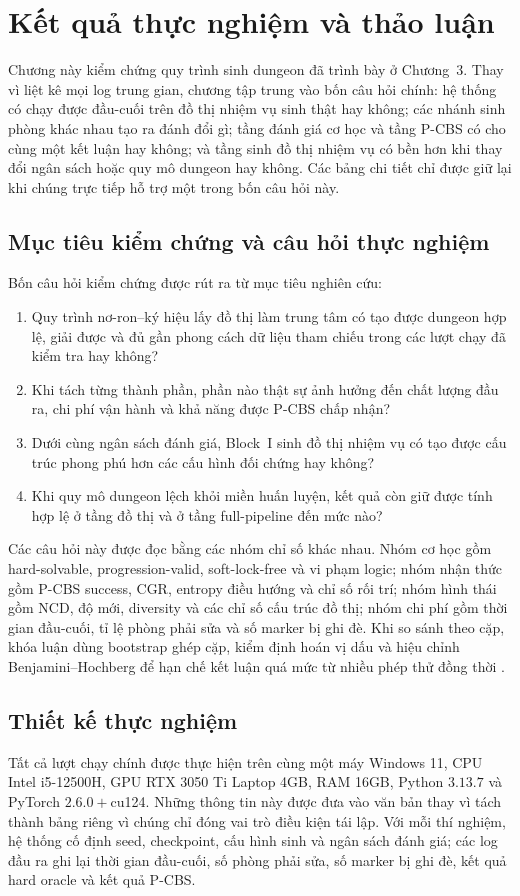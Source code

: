 \documentclass[oneside,a4paper,12pt]{extreport}
\begin{document}
\chapter{Kết quả thực nghiệm và thảo luận}
Chương này kiểm chứng quy trình sinh dungeon đã trình bày ở Chương~3. Thay vì liệt kê mọi log trung gian, chương tập trung vào bốn câu hỏi chính: hệ thống có chạy được đầu-cuối trên đồ thị nhiệm vụ sinh thật hay không; các nhánh sinh phòng khác nhau tạo ra đánh đổi gì; tầng đánh giá cơ học và tầng P-CBS có cho cùng một kết luận hay không; và tầng sinh đồ thị nhiệm vụ có bền hơn khi thay đổi ngân sách hoặc quy mô dungeon hay không. Các bảng chi tiết chỉ được giữ lại khi chúng trực tiếp hỗ trợ một trong bốn câu hỏi này.

\section{Mục tiêu kiểm chứng và câu hỏi thực nghiệm}
Bốn câu hỏi kiểm chứng được rút ra từ mục tiêu nghiên cứu:
\begin{enumerate}[label=(RQ\arabic*)]
  \item Quy trình nơ-ron--ký hiệu lấy đồ thị làm trung tâm có tạo được dungeon hợp lệ, giải được và đủ gần phong cách dữ liệu tham chiếu trong các lượt chạy đã kiểm tra hay không?
  \item Khi tách từng thành phần, phần nào thật sự ảnh hưởng đến chất lượng đầu ra, chi phí vận hành và khả năng được P-CBS chấp nhận?
  \item Dưới cùng ngân sách đánh giá, Block~I sinh đồ thị nhiệm vụ có tạo được cấu trúc phong phú hơn các cấu hình đối chứng hay không?
  \item Khi quy mô dungeon lệch khỏi miền huấn luyện, kết quả còn giữ được tính hợp lệ ở tầng đồ thị và ở tầng full-pipeline đến mức nào?
\end{enumerate}

Các câu hỏi này được đọc bằng các nhóm chỉ số khác nhau. Nhóm cơ học gồm hard-solvable, progression-valid, soft-lock-free và vi phạm logic; nhóm nhận thức gồm P-CBS success, CGR, entropy điều hướng và chỉ số rối trí; nhóm hình thái gồm NCD, độ mới, diversity và các chỉ số cấu trúc đồ thị; nhóm chi phí gồm thời gian đầu-cuối, tỉ lệ phòng phải sửa và số marker bị ghi đè. Khi so sánh theo cặp, khóa luận dùng bootstrap ghép cặp, kiểm định hoán vị dấu và hiệu chỉnh Benjamini--Hochberg để hạn chế kết luận quá mức từ nhiều phép thử đồng thời \cite{efron1994bootstrap,benjamini1995fdr}.

\section{Thiết kế thực nghiệm}
Tất cả lượt chạy chính được thực hiện trên cùng một máy Windows 11, CPU Intel i5-12500H, GPU RTX 3050 Ti Laptop 4GB, RAM 16GB, Python $3.13.7$ và PyTorch $2.6.0{+}$cu124. Những thông tin này được đưa vào văn bản thay vì tách thành bảng riêng vì chúng chỉ đóng vai trò điều kiện tái lập. Với mỗi thí nghiệm, hệ thống cố định seed, checkpoint, cấu hình sinh và ngân sách đánh giá; các log đầu ra ghi lại thời gian đầu-cuối, số phòng phải sửa, số marker bị ghi đè, kết quả hard oracle và kết quả P-CBS.
\end{document}
